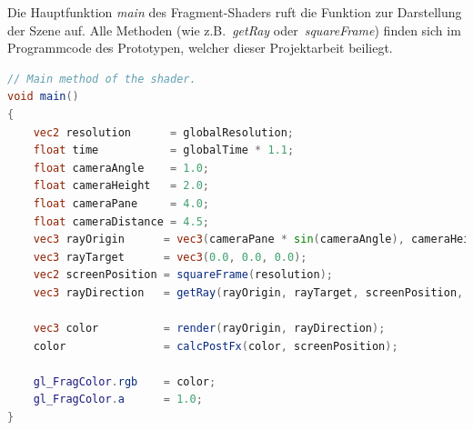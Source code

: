 Die Hauptfunktion \textit{main} des Fragment-Shaders ruft die Funktion
zur Darstellung der Szene auf. Alle Methoden (wie z.B.~\textit{getRay}
oder~\textit{squareFrame}) finden sich im Programmcode des Prototypen,
welcher dieser Projektarbeit beiliegt.

\begin{lstlisting}[language=GLSL,caption={Einstiegspunkt des
        Fragment-Shaders.},
    label={alg:glsl_main},captionpos=b,emph={main}]
// Main method of the shader.
void main()
{
    vec2 resolution      = globalResolution;
    float time           = globalTime * 1.1;
    float cameraAngle    = 1.0;
    float cameraHeight   = 2.0;
    float cameraPane     = 4.0;
    float cameraDistance = 4.5;
    vec3 rayOrigin      = vec3(cameraPane * sin(cameraAngle), cameraHeight, cameraDistance * cos(cameraAngle * time));
    vec3 rayTarget      = vec3(0.0, 0.0, 0.0);
    vec2 screenPosition = squareFrame(resolution);
    vec3 rayDirection   = getRay(rayOrigin, rayTarget, screenPosition, 2.0);

    vec3 color          = render(rayOrigin, rayDirection);
    color               = calcPostFx(color, screenPosition);

    gl_FragColor.rgb    = color;
    gl_FragColor.a      = 1.0;
}
\end{lstlisting}
